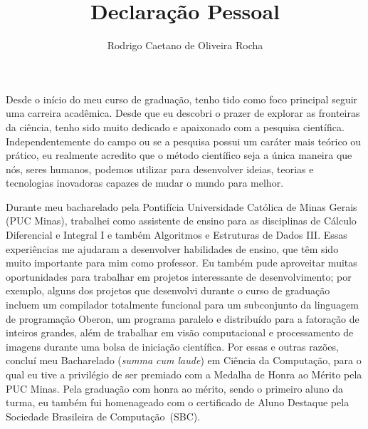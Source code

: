 \documentclass{article}
\title{Declara\c{c}\~{a}o Pessoal}
\author{Rodrigo Caetano de Oliveira Rocha}
\date{}
\begin{document}
\maketitle

Desde o in\'{i}cio do meu curso de gradua\c{c}\~{a}o, tenho tido como foco
principal seguir uma carreira acad\^{e}mica. Desde que eu descobri o prazer de
explorar as fronteiras da ci\^{e}ncia, tenho sido muito dedicado e apaixonado
com a pesquisa cient\'{i}fica. Independentemente do campo ou se a pesquisa
possui um car\'{a}ter mais te\'{o}rico ou pr\'{a}tico, eu realmente acredito
que o m\'{e}todo cient\'{i}fico seja a \'{u}nica maneira que n\'{o}s, seres
humanos, podemos utilizar para desenvolver ideias, teorias e tecnologias
inovadoras capazes de mudar o mundo para melhor.

Durante meu bacharelado pela Pontif\'{i}cia Universidade Cat\'{o}lica de Minas
Gerais (PUC Minas), trabalhei como assistente de ensino para as disciplinas de
C\'{a}lculo Diferencial e Integral I e tamb\'{e}m Algoritmos e Estruturas de
Dados III. Essas experi\^{e}ncias me ajudaram a desenvolver habilidades de
ensino, que t\^{e}m sido muito importante para mim como professor. Eu
tamb\'{e}m pude aproveitar muitas oportunidades para trabalhar em projetos
interessante de desenvolvimento; por exemplo, alguns dos projetos que
desenvolvi durante o curso de gradua\c{c}\~{a}o incluem um compilador
totalmente funcional para um subconjunto da linguagem de programa\c{c}\~{a}o
Oberon, um programa paralelo e distribu\'{i}do para a fatora\c{c}\~{a}o de
inteiros grandes, al\'{e}m de trabalhar em vis\~{a}o computacional e
processamento de imagens durante uma bolsa de inicia\c{c}\~{a}o cient\'{i}fica.
Por essas e outras raz\~{o}es, conclu\'{i} meu Bacharelado ({\em summa cum
laude}) em Ci\^{e}ncia da Computa\c{c}\~{a}o, para o qual eu tive a
privil\'{e}gio de ser premiado com a Medalha de Honra ao M\'{e}rito pela PUC
Minas. Pela gradua\c{c}\~{a}o com honra ao m\'{e}rito, sendo o primeiro aluno
da turma, eu tamb\'{e}m fui homenageado com o certificado de Aluno Destaque
pela Sociedade Brasileira de Computa\c{c}\~{a}o~(SBC).
\end{document}
